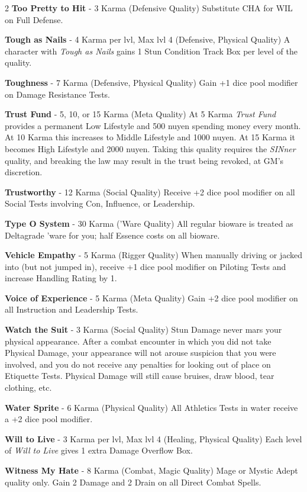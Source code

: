 \documentclass[
  oneside]{article}
\begin{document}
\begin{multicols}{2}
\textbf{Too Pretty to Hit} - 3 Karma (Defensive
Quality) Substitute CHA for WIL on Full Defense.

\textbf{Tough as Nails} - 4 Karma per lvl, Max lvl
4 (Defensive, Physical Quality) A character with
\emph{Tough as Nails} gains 1 Stun Condition Track
Box per level of the quality.

\textbf{Toughness} - 7 Karma (Defensive, Physical
Quality) Gain +1 dice pool modifier on Damage
Resistance Tests.

\textbf{Trust Fund} - 5, 10, or 15 Karma (Meta
Quality) At 5 Karma \emph{Trust Fund} provides a
permanent Low Lifestyle and 500 nuyen spending
money every month. At 10 Karma this increases to
Middle Lifestyle and 1000 nuyen. At 15 Karma it
becomes High Lifestyle and 2000 nuyen. Taking this
quality requires the \emph{SINner} quality, and
breaking the law may result in the trust being
revoked, at GM's discretion.

\textbf{Trustworthy} - 12 Karma (Social Quality)
Receive +2 dice pool modifier on all Social Tests
involving Con, Influence, or Leadership.

\textbf{Type O System} - 30 Karma ('Ware Quality)
All regular bioware is treated as Deltagrade 'ware
for you; half Essence costs on all bioware.

\textbf{Vehicle Empathy} - 5 Karma (Rigger
Quality) When manually driving or jacked into (but
not jumped in), receive +1 dice pool modifier on
Piloting Tests and increase Handling Rating by 1.

\textbf{Voice of Experience} - 5 Karma (Meta
Quality) Gain +2 dice pool modifier on all
Instruction and Leadership Tests.

\textbf{Watch the Suit} - 3 Karma (Social Quality)
Stun Damage never mars your physical appearance.
After a combat encounter in which you did not take
Physical Damage, your appearance will not arouse
suspicion that you were involved, and you do not
receive any penalties for looking out of place on
Etiquette Tests. Physical Damage will still cause
bruises, draw blood, tear clothing, etc.

\textbf{Water Sprite} - 6 Karma (Physical Quality)
All Athletics Tests in water receive a +2 dice
pool modifier.

\textbf{Will to Live} - 3 Karma per lvl, Max lvl 4
(Healing, Physical Quality) Each level of
\emph{Will to Live} gives 1 extra Damage Overflow
Box.

\textbf{Witness My Hate} - 8 Karma (Combat, Magic
Quality) Mage or Mystic Adept quality only. Gain 2
Damage and 2 Drain on all Direct Combat Spells.


\end{multicols}
\end{document}
